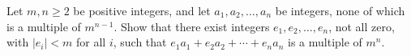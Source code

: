 Let $m, n \geq 2$ be positive integers, and let $a_1, a_2, \ldots, a_n$ be integers, none of which is a multiple of $m^{n-1}$. Show that there exist integers $e_1, e_2, \ldots, e_n$, not all zero, with $|e_i| < m$ for all $i$, such that $e_1 a_1 + e_2 a_2 + \cdots + e_n a_n$ is a multiple of $m^n$.
